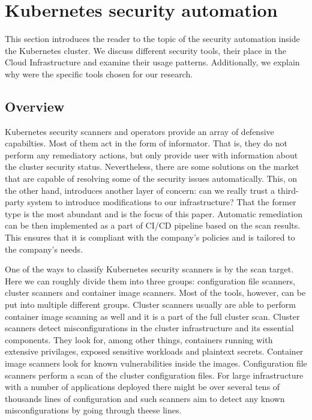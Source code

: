 \section{Kubernetes security automation}
\label{sec:kubernetes-security-automation}

This section introduces the reader to the topic of the security automation inside the Kubernetes cluster. We discuss different security tools, their place in the Cloud Infrastructure and examine their usage patterns. Additionally, we explain why were the specific tools chosen for our research.

\subsection{Overview}

Kubernetes security scanners and operators provide an array of defensive capabilties. Most of them act in the form of informator. That is, they do not perform any remediatory actions, but only provide user with information about the cluster security status. Nevertheless, there are some solutions on the market that are capable of resolving some of the security issues automatically. This, on the other hand, introduces another layer of concern: can we really trust a third-party system to introduce modifications to our infrastructure? That the former type is the most abundant and is the focus of this paper. Automatic remediation can be then implemented as a part of CI/CD pipeline based on the scan results. This ensures that it is compliant with the company's policies and is tailored to the company's needs.

One of the ways to classify Kubernetes security scanners is by the scan target. Here we can roughly divide them into three groups: configuration file scanners, cluster scanners and container image scanners. Most of the tools, however, can be put into multiple different groups. Cluster scanners usually are able to perform container image scanning as well and it is a part of the full cluster scan. Cluster scanners detect misconfigurations in the cluster infrastructure and its essential components. They look for, among other things, containers running with extensive privilages, exposed sensitive workloads and plaintext secrets. Container image scanners look for known vulnerabilities inside the images. Configuration file scanners perform a scan of the cluster configuration files. For large infrastructure with a number of applications deployed there might be over several tens of thousands lines of configuration and such scanners aim to detect any known misconfigurations by going through theese lines.

